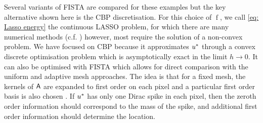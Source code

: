 \documentclass[smallextended]{svjour3}
\newcommand{\op}[1]{\operatorname{#1}}
\newcommand{\1}{\F{1}}
\newcommand{\meshsize}{h}
\newcommand*{\var}[1]{%
	\IfEqCase{#1}{%
		{0}{u}%
		{1}{v}%
		{2}{w}%
	}[u#1]%
}
\begin{document}
	Several variants of FISTA are compared for these examples but the key alternative shown here is the CBP discretisation. For this choice of $\op{f}$, we call \eqref{eq: Lasso energy} the continuous LASSO problem, for which there are many numerical methods (c.f. \cite{Bredies2013,Castro2016,Boyd2017,Catala2019}) however, most require the solution of a non-convex problem. We have focused on CBP because it approximates $\var0^*$ through a convex discrete optimisation problem which is asymptotically exact in the limit $\meshsize\to0$. It can also be optimised with FISTA which allows for direct comparison with the uniform and adaptive mesh approaches. The idea is that for a fixed mesh, the kernels of $\mathsf{A}$ are expanded to first order on each pixel and a particular first order basis is also chosen \cite{Ekanadham2011,Duval2017b}. If $\var0^*$ has only one Dirac spike in each pixel, then the zeroth order information should correspond to the mass of the spike, and additional first order information should determine the location.
	
\end{document}
